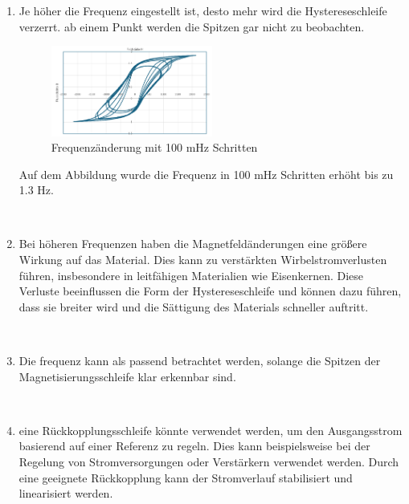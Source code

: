 \documentclass[a4paper,twoside,12pt,DIV=13,BCOR=5mm,numbers=noenddot,cleardoublepage=empty]{scrbook}
\begin{document}
\begin{enumerate}
            \\

            \item Je höher die Frequenz eingestellt ist, desto mehr wird die Hystereseschleife verzerrt. ab einem Punkt werden die Spitzen gar nicht zu beobachten.

            \begin{figure}[h] 
            \centering
            \includegraphics[width=0.5\textwidth]{pictures/freqAnderung.png} 
            \caption{Frequenzänderung mit 100 mHz Schritten}
            \label{fig:meinbild}
            \end{figure}

            Auf dem Abbildung wurde die Frequenz in 100 mHz Schritten erhöht bis zu 1.3 Hz.
            
            \\
            
            \item Bei höheren Frequenzen haben die Magnetfeldänderungen eine größere Wirkung auf das Material. Dies kann zu verstärkten Wirbelstromverlusten führen, insbesondere in leitfähigen Materialien wie Eisenkernen. Diese Verluste beeinflussen die Form der Hystereseschleife und können dazu führen, dass sie breiter wird und die Sättigung des Materials schneller auftritt.

            \\
            
            \item Die frequenz kann als passend betrachtet werden, solange die Spitzen der Magnetisierungsschleife klar erkennbar sind.

            \\
            
            \item eine Rückkopplungsschleife könnte verwendet werden, um den Ausgangsstrom basierend auf einer Referenz zu regeln. Dies kann beispielsweise bei der Regelung von Stromversorgungen oder Verstärkern verwendet werden. Durch eine geeignete Rückkopplung kann der Stromverlauf stabilisiert und linearisiert werden.
            

\end{enumerate}
\end{document}
